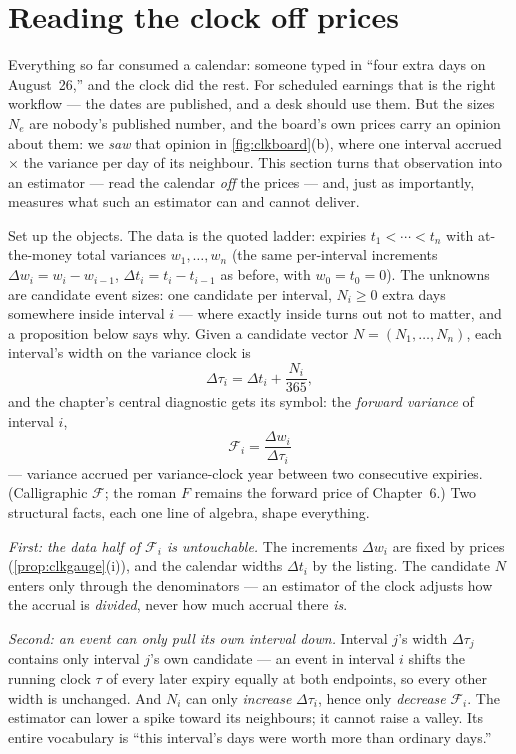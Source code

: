 \section{Reading the clock off prices}
\label{sec:clkinverse}

Everything so far consumed a calendar: someone typed in ``four extra
days on August~26,'' and the clock did the rest.  For scheduled
earnings that is the right workflow --- the dates are published, and
a desk should use them.  But the sizes $N_e$ are nobody's published
number, and the board's own prices carry an opinion about them: we
\emph{saw} that opinion in \cref{fig:clkboard}(b), where one interval
accrued \MacClkBoardHotOverLull$\times$ the variance per day of its
neighbour.  This section turns that observation into an estimator ---
read the calendar \emph{off} the prices --- and, just as importantly,
measures what such an estimator can and cannot deliver.

Set up the objects.  The data is the quoted ladder: expiries
$t_1<\cdots<t_n$ with at-the-money total variances $w_1,\dots,w_n$
(the same per-interval increments $\Delta w_i=w_i-w_{i-1}$,
$\Delta t_i=t_i-t_{i-1}$ as before, with $w_0=t_0=0$).  The unknowns
are candidate event sizes: one candidate per interval, $N_i\ge0$
extra days somewhere inside interval $i$ --- where exactly inside
turns out not to matter, and a proposition below says why.  Given a
candidate vector $N=(N_1,\dots,N_n)$, each interval's width on the
variance clock is
\[
\Delta\tau_i=\Delta t_i+\frac{N_i}{365},
\]
and the chapter's central diagnostic gets its symbol: the
\emph{forward variance} of interval $i$,
\[
\mathcal{F}_i=\frac{\Delta w_i}{\Delta\tau_i}
\]
--- variance accrued per variance-clock year between two consecutive
expiries.  (Calligraphic $\mathcal{F}$; the roman $F$ remains the
forward price of Chapter~6.)  Two structural facts, each one line of
algebra, shape everything.

\emph{First: the data half of $\mathcal{F}_i$ is untouchable.}  The
increments $\Delta w_i$ are fixed by prices
(\cref{prop:clkgauge}(i)), and the calendar widths $\Delta t_i$ by
the listing.  The candidate $N$ enters only through the denominators
--- an estimator of the clock adjusts how the accrual is
\emph{divided}, never how much accrual there \emph{is}.

\emph{Second: an event can only pull its own interval down.}
Interval $j$'s width $\Delta\tau_j$ contains only interval $j$'s own
candidate --- an event in interval $i$ shifts the running clock
$\tau$ of every later expiry equally at both endpoints, so every
other width is unchanged.  And $N_i$ can only \emph{increase}
$\Delta\tau_i$, hence only \emph{decrease} $\mathcal{F}_i$.  The
estimator can lower a spike toward its neighbours; it cannot raise a
valley.  Its entire vocabulary is ``this interval's days were worth
more than ordinary days.''

